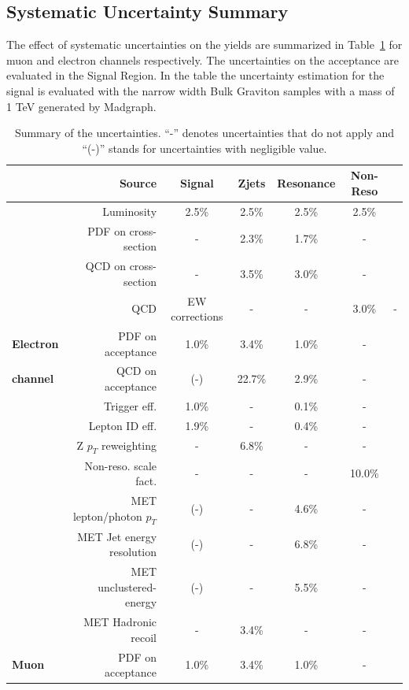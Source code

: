 \subsection{Systematic Uncertainty Summary}
The effect of systematic uncertainties on the yields are summarized in Table~\ref{tab:unc_summary} for muon and electron channels respectively. The uncertainties on the acceptance are evaluated in the Signal Region. In the table the uncertainty estimation for the signal is evaluated with the narrow width Bulk Graviton samples with a mass of 1 TeV generated by Madgraph.
\begin{table}[htbp]
\caption{Summary of the uncertainties. ``-'' denotes uncertainties that do not apply and ``(-)'' stands for uncertainties with negligible value.} 
\label{tab:unc_summary}
\begin{center}
\begin{footnotesize}
\begin{tabular}{l r c c c c c }
\hline\hline
%
{}	&	Source				&	Signal 	&	Zjets		&	Resonance		&	Non-Reso 				\\ \hline\hline
{}	&	Luminosity			&	2.5\%	&	2.5\%		&	2.5\%			&	2.5\%					\\
{}	&	PDF on cross-section		&	-	&	2.3\%		&	1.7\%			&	-						\\
{}	&	QCD on cross-section		&	-	&	3.5\%		&	3.0\%			&	-						\\
{}	&	QCD & EW corrections		&	-	&	-		&	3.0\%			&	-						\\
\hline\hline
{\bf Electron}&PDF on acceptance		&	1.0\%	&	3.4\%		&	1.0\%			&	-						\\
{\bf channel}&QCD on acceptance			&  	(-)	&	22.7\%		&	2.9\%			&	-						\\ 
{}	&	Trigger eff.			&	1.0\%	&	-		&	0.1\%			&	-						\\
{}	&	Lepton ID eff.			&	1.9\%	&	-		&	0.4\%			&	-						\\
{}	&	Z $p_T$ reweighting		&	-	&	6.8\%		&	-			&	-						\\
{}	&	Non-reso. scale fact.		&	-	&	-		&	-			&	10.0\%					\\ 
{}	&	MET lepton/photon $p_T$ 	&	(-)	&	-		&	4.6\%			&	-						\\
{}	&	MET Jet energy resolution	&	(-)	&	-		&	6.8\%			&	-						\\
{}	&	MET unclustered-energy		&	(-)	&	-		&	5.5\%			&	-						\\
{}	&	MET Hadronic recoil		&	-	&	3.4\%		&	-			&	-						\\ 
\hline\hline
{\bf Muon}&PDF on acceptance			&	1.0\%	&	3.4\%		&	1.0\%			&	-						\\

\end{tabular}
\end{footnotesize}
\end{center}
\end{table}
